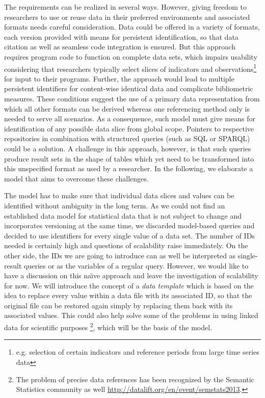 \documentclass{sig-alternate}
\begin{document}
The requirements can be realized in several ways.
However, giving freedom to researchers to use or reuse data in their preferred environments and associated formats needs careful consideration.
Data could be offered in a variety of formats, each version provided with means for persistent identification, so that data citation as well as seamless code integration is ensured.
But this approach requires program code to function on complete data sets, which impairs usability considering that researchers typically select slices of indicators and observations\footnote{e.g. selection of certain indicators and reference periods from large time series data} for input to their programs.
Further, the approach would lead to multiple persistent identifiers for content-wise identical data and complicate bibliometric measures.
These conditions suggest the use of a primary data representation from which all other formats can be derived whereas one referencing method only is needed to serve all scenarios.
As a consequence, such model must give means for identification of any possible data slice from global scope.
Pointers to respective repositories in combination with structured queries (such as SQL or SPARQL) could be a solution.
A challenge in this approach, however, is that such queries produce result sets in the shape of tables which yet need to be transformed into this unspecified format as used by a researcher.
In the following, we elaborate a model that aims to overcome these challenges.

The model has to make sure that individual data slices and values can be identified without ambiguity in the long term.
As we could not find an established data model for statistical data that is not subject to change and incorporates versioning at the same time, we discarded model-based queries and decided to use identifiers for every single value of a data set.
The number of IDs needed is certainly high and questions of scalability raise immediately.
On the other side, the IDs we are going to introduce can as well be interpreted as single-result queries or as the variables of a regular query.
However, we would like to have a discussion on this na\"{\i}ve approach and leave the investigation of scalability for now.
We will introduce the concept of a \textit{data template} which is based on the idea to replace every value within a data file with its associated ID, so that the original file can be restored again simply by replacing them back with its associated values.
This could also help solve some of the problems in using linked data for scientific purposes \cite{bechhofer2010linked}\footnote{The problem of precise data references has been recognized by the Semantic Statistics community as well \url{http://datalift.org/en/event/semstats2013}.}, which will be the basis of the model.
\end{document}
